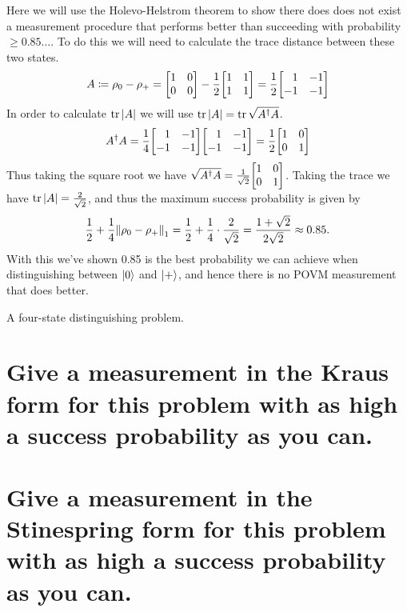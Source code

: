 \documentclass[boxes,pages]{homework}
\begin{document}
\begin{solution}
	Here we will use the Holevo-Helstrom theorem to show there does does not exist a measurement procedure that performs better than succeeding with probability $\geq 0.85\ldots$.
	To do this we will need to calculate the trace distance between these two states.
	\begin{equation*}
		A \coloneqq \rho_0 - \rho_+ = \mqty[1 & 0 \\ 0 & 0 ] - \frac{1}{2}\mqty[1 & 1 \\ 1 & 1] = \frac{1}{2}\mqty[\phantom{-}1 & -1 \\ -1 & -1]
	\end{equation*}
	In order to calculate $\tr\abs{A}$ we will use $\tr\abs{A} = \tr\sqrt{A^\dagger A}$.
	\begin{equation*}
		A^\dagger A = \frac{1}{4}\mqty[\phantom{-}1 & -1 \\ -1 & -1]\mqty[\phantom{-}1 & -1 \\ -1 & -1] = \frac{1}{2}\mqty[\imat{2}]
	\end{equation*}
	Thus taking the square root we have $\sqrt{A^\dagger A} = \frac{1}{\sqrt{2}}\mqty[\imat{2}]$.
	Taking the trace we have $\tr\abs{A} = \frac{2}{\sqrt{2}}$, and thus the maximum success probability is given by
	\begin{equation*}
		\frac{1}{2} + \frac{1}{4}\norm{\rho_0 - \rho_+}_1 = \frac{1}{2} + \frac{1}{4}\cdot \frac{2}{\sqrt{2}} = \frac{1 + \sqrt{2}}{2\sqrt{2}}\approx 0.85.
	\end{equation*}
	With this we've shown 0.85 is the best probability we can achieve when distinguishing between $\ket{0}$ and $\ket{+}$, and hence there is no POVM measurement that does better.
\end{solution}

\begin{problem}
A four-state distinguishing problem.
\begin{parts}
	\part{Give a measurement in the Kraus form for this problem with as high a success probability as you can.}\label{part:3a}
	\part{Give a measurement in the Stinespring form for this problem with as high a success probability as you can.}\label{part:3b}
\end{parts}
\end{problem}
\end{document}
